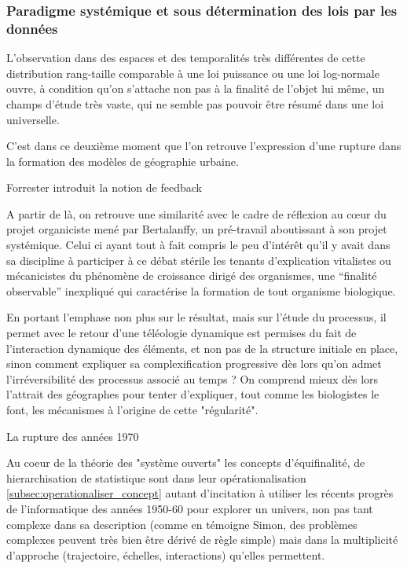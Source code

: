 \subsubsection{Paradigme systémique et sous détermination des lois par les données}






L'observation dans des espaces et des temporalités très différentes \autocite{Pumain1997} de cette distribution rang-taille comparable à une loi puissance ou une loi log-normale ouvre, à condition qu'on s'attache non pas à la finalité de l'objet lui même, un champs d'étude très vaste, qui ne semble pas pouvoir être résumé dans une loi universelle.



C'est dans ce deuxième moment que l'on retrouve l'expression d'une rupture dans la formation des modèles de géographie urbaine.

Forrester introduit la notion de feedback

A partir de là, on retrouve une similarité avec le cadre de réflexion au cœur du projet organiciste mené par Bertalanffy, un pré-travail aboutissant à son projet systémique. Celui ci ayant tout à fait compris le peu d’intérêt qu'il y avait dans sa discipline à participer à ce débat stérile les tenants d'explication vitalistes ou mécanicistes du phénomène de croissance dirigé des organismes, une \enquote{finalité observable} inexpliqué qui caractérise la formation de tout organisme biologique. 

En portant l'emphase non plus sur le résultat, mais sur l'étude du processus, il permet avec le retour d'une téléologie dynamique est permises du fait de l'interaction dynamique des éléments, et non pas de la structure initiale en place, sinon comment expliquer sa complexification progressive dès lors qu'on admet l'irréversibilité des processus associé au temps ? On comprend mieux dès lors l'attrait des géographes pour tenter d'expliquer, tout comme les biologistes le font, les mécanismes à l'origine de cette "régularité".

La rupture des années 1970 

Au coeur de la théorie des "système ouverts" les concepts d'équifinalité, de hierarchisation de statistique sont dans leur opérationalisation \ref{subsec:operationaliser_concept} autant d'incitation à utiliser les récents progrès de l'informatique des années 1950-60 pour explorer un univers, non pas tant complexe dans sa description (comme en témoigne Simon, des problèmes complexes peuvent très bien être dérivé de règle simple) mais dans la multiplicité d'approche (trajectoire, échelles, interactions) qu'elles permettent.


